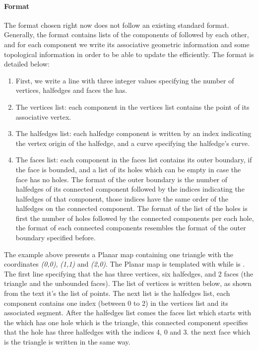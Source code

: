 \begin{ccAdvanced}
\paragraph{Format}
The format chosen right now does not follow an existing standard format. 
Generally, the format contains lists of the components of  followed by each other, 
and for each component we write its associative geometric information and some topological information in order to be able to update 
the  efficiently. The format is detailed below:

\begin{enumerate}
\item First, we write a line with three integer values specifying the number of vertices, halfedges and faces the  has.
\item The vertices list: each component in the vertices list contains the point of its associative vertex.
\item The halfedges list: each halfedge component is written by an index indicating the vertex origin of the halfedge, and a curve specifying the halfedge's curve.
\item The faces list: each component in the faces list contains its outer boundary, if the face is bounded, and a list of its holes which can be empty in case the face has no holes. The format of the outer boundary is the number of halfedges of its connected component followed by the indices indicating the halfedges of that component, those indices have the same order of the halfedges on the connected component. 
The format of the list of the holes is first the number of holes followed by the connected components per each hole, the format of each connected components resembles the format of the outer boundary specified before.
\end{enumerate}


The example above presents a Planar map containing one triangle with the coordinates {\em (0,0)}, {\em (1,1)} and {\em (2,0)}. 
The Planar map is templated with  while  is .
The first line specifying that the  has three vertices, six halfedges, and 2 faces (the triangle and the unbounded faces). 
The list of vertices is written below, as shown from the text it's the list of points. The next list is the halfedges list, each component contains one 
index (between 0 to 2) in the vertices list and its associated segment. After the halfedges list comes the faces list which starts with the 
 which has one hole which is the triangle, this connected component specifies that the hole has three halfedges with 
the indices 4, 0 and 3. the next face which is the triangle is written in the same way.


\end{ccAdvanced}
